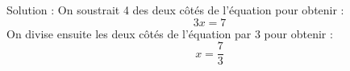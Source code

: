 \documentclass{article}
\begin{document}
Solution :
On soustrait 4 des deux côtés de l'équation pour obtenir :
\[3x = 7\]
On divise ensuite les deux côtés de l'équation par 3 pour obtenir :
\[x = \frac{7}{3}\]
\end{document}
